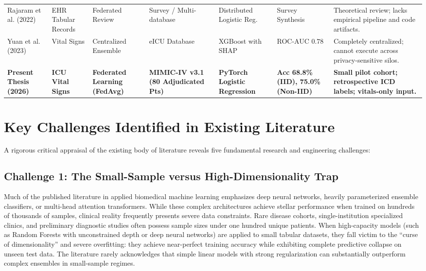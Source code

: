 \begin{table}[htbp]
{\begin{tabular}{@{}llllll>{\raggedright\arraybackslash}p{4.5cm}@{}}
Rajaram et al. (2022) \citep{rajaram2022privacy} & EHR Tabular Records & Federated Review & Survey / Multi-database & Distributed Logistic Reg. & Survey Synthesis & Theoretical review; lacks empirical pipeline and code artifacts. \\ \addlinespace
Yuan et al. (2023) & Vital Signs & Centralized Ensemble & eICU Database & XGBoost with SHAP & ROC-AUC $0.78$ & Completely centralized; cannot execute across privacy-sensitive silos. \\ \addlinespace
\textbf{Present Thesis (2026)} & \textbf{ICU Vital Signs} & \textbf{Federated Learning (FedAvg)} & \textbf{MIMIC-IV v3.1 (80 Adjudicated Pts)} & \textbf{PyTorch Logistic Regression} & \textbf{Acc 68.8\% (IID), 75.0\% (Non-IID)} & \textbf{Small pilot cohort; retrospective ICD labels; vitals-only input.} \\ \bottomrule
\end{tabular}%
}
\end{table}

\section{Key Challenges Identified in Existing Literature}
\label{sec:challenges_identified}

A rigorous critical appraisal of the existing body of literature reveals five fundamental research and engineering challenges:

\subsection{Challenge 1: The Small-Sample versus High-Dimensionality Trap}
Much of the published literature in applied biomedical machine learning emphasizes deep neural networks, heavily parameterized ensemble classifiers, or multi-head attention transformers. While these complex architectures achieve stellar performance when trained on hundreds of thousands of samples, clinical reality frequently presents severe data constraints. Rare disease cohorts, single-institution specialized clinics, and preliminary diagnostic studies often possess sample sizes under one hundred unique patients. When high-capacity models (such as Random Forests with unconstrained depth or deep neural networks) are applied to small tabular datasets, they fall victim to the ``curse of dimensionality'' and severe overfitting: they achieve near-perfect training accuracy while exhibiting complete predictive collapse on unseen test data. The literature rarely acknowledges that simple linear models with strong regularization can substantially outperform complex ensembles in small-sample regimes.

